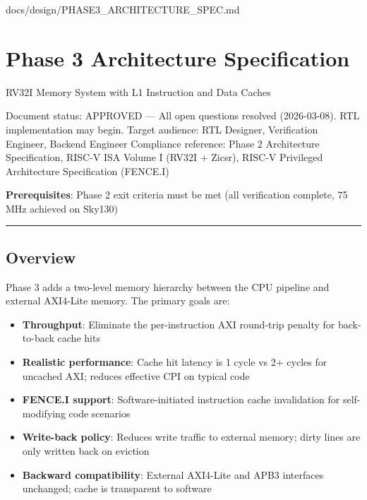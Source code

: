 \begin{relocated}{docs/design/PHASE3_ARCHITECTURE_SPEC.md}
\section{Phase 3 Architecture Specification}\label{ds:ch:phase3-architecture}

RV32I Memory System with L1 Instruction and Data Caches

Document status: APPROVED --- All open questions resolved (2026-03-08).
RTL implementation may begin. Target audience: RTL Designer,
Verification Engineer, Backend Engineer Compliance reference: Phase 2
Architecture Specification, RISC-V ISA Volume I (RV32I + Zicsr), RISC-V
Privileged Architecture Specification (FENCE.I)

\textbf{Prerequisites}: Phase 2 exit criteria must be met (all
verification complete, 75 MHz achieved on Sky130)

\begin{center}\rule{0.5\linewidth}{0.5pt}\end{center}

\subsection{Overview}\label{ds:ch:phase3-architecture:1-overview}

Phase 3 adds a two-level memory hierarchy between the CPU pipeline and
external AXI4-Lite memory. The primary goals are:

\begin{itemize}
\tightlist
\item
  \textbf{Throughput}: Eliminate the per-instruction AXI round-trip
  penalty for back-to-back cache hits
\item
  \textbf{Realistic performance}: Cache hit latency is 1 cycle vs 2+
  cycles for uncached AXI; reduces effective CPI on typical code
\item
  \textbf{FENCE.I support}: Software-initiated instruction cache
  invalidation for self-modifying code scenarios
\item
  \textbf{Write-back policy}: Reduces write traffic to external memory;
  dirty lines are only written back on eviction
\item
  \textbf{Backward compatibility}: External AXI4-Lite and APB3
  interfaces unchanged; cache is transparent to software
\end{itemize}


\end{relocated}
